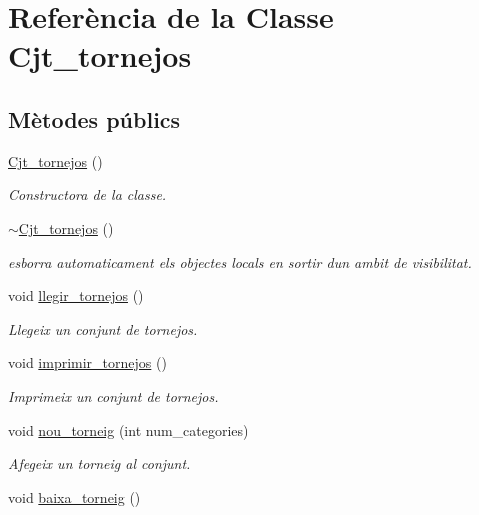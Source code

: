 \hypertarget{class_cjt__tornejos}{}\section{Referència de la Classe Cjt\+\_\+tornejos}
\label{class_cjt__tornejos}
\subsection*{Mètodes públics}
\begin{DoxyCompactItemize}
\item 
\mbox{\hyperlink{class_cjt__tornejos_a802f937a72b37c2a675734cb3d6f6257}{Cjt\+\_\+tornejos}} ()
\begin{DoxyCompactList}\small\item\em Constructora de la classe. \end{DoxyCompactList}\item 
\mbox{\hyperlink{class_cjt__tornejos_a0c3c68b4cc7c962a2b8d6f9efeb2a84e}{$\sim$\+Cjt\+\_\+tornejos}} ()
\begin{DoxyCompactList}\small\item\em esborra automaticament els objectes locals en sortir d\textquotesingle{}un ambit de visibilitat. \end{DoxyCompactList}\item 
void \mbox{\hyperlink{class_cjt__tornejos_acc9a50af4b8896eb4e3faebb495a2ac7}{llegir\+\_\+tornejos}} ()
\begin{DoxyCompactList}\small\item\em Llegeix un conjunt de tornejos. \end{DoxyCompactList}\item 
void \mbox{\hyperlink{class_cjt__tornejos_a0950e966b60873b9ff216b2f8ec0c60a}{imprimir\+\_\+tornejos}} ()
\begin{DoxyCompactList}\small\item\em Imprimeix un conjunt de tornejos. \end{DoxyCompactList}\item 
void \mbox{\hyperlink{class_cjt__tornejos_ac4298fab4f5ed1d33c762dd837f50b8a}{nou\+\_\+torneig}} (int num\+\_\+categories)
\begin{DoxyCompactList}\small\item\em Afegeix un torneig al conjunt. \end{DoxyCompactList}\item 
void \mbox{\hyperlink{class_cjt__tornejos_ae549ea64527b0876bb395ba957faf387}{baixa\+\_\+torneig}} ()

\end{DoxyCompactItemize}
